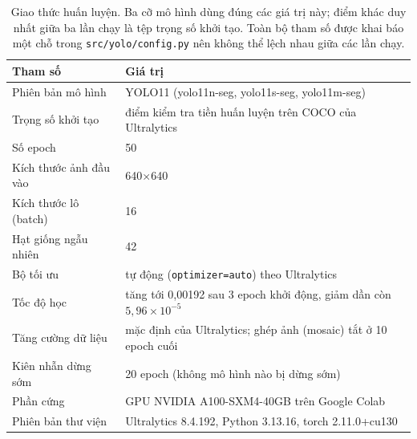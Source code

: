 \begin{table}[H]
\centering
\caption{Giao thức huấn luyện. Ba cỡ mô hình dùng đúng các giá trị này; điểm khác duy nhất giữa ba lần chạy là tệp trọng số khởi tạo. Toàn bộ tham số được khai báo một chỗ trong \texttt{src/yolo/config.py} nên không thể lệch nhau giữa các lần chạy.}
\label{tab:protocol}
\small
\begin{tabular}{l l}
\toprule
Tham số & Giá trị \\
\midrule
Phiên bản mô hình & YOLO11 (yolo11n-seg, yolo11s-seg, yolo11m-seg) \\
Trọng số khởi tạo & điểm kiểm tra tiền huấn luyện trên COCO của Ultralytics \\
Số epoch & 50 \\
Kích thước ảnh đầu vào & 640$\times$640 \\
Kích thước lô (batch) & 16 \\
Hạt giống ngẫu nhiên & 42 \\
Bộ tối ưu & tự động (\texttt{optimizer=auto}) theo Ultralytics \\
Tốc độ học & tăng tới 0{,}00192 sau 3 epoch khởi động, giảm dần còn $5{,}96\times 10^{-5}$ \\
Tăng cường dữ liệu & mặc định của Ultralytics; ghép ảnh (mosaic) tắt ở 10 epoch cuối \\
Kiên nhẫn dừng sớm & 20 epoch (không mô hình nào bị dừng sớm) \\
Phần cứng & GPU NVIDIA A100-SXM4-40GB trên Google Colab \\
Phiên bản thư viện & Ultralytics 8.4.192, Python 3.13.16, torch 2.11.0+cu130 \\
\bottomrule
\end{tabular}
\end{table}
